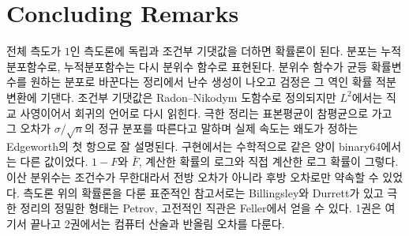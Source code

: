 \section{Concluding Remarks}

전체 측도가 $1$인 측도론에 독립과 조건부 기댓값을 더하면 확률론이 된다. 분포는 누적분포함수로, 누적분포함수는 다시 분위수 함수로 표현된다. 분위수 함수가 균등 확률변수를 원하는 분포로 바꾼다는 정리에서 난수 생성이 나오고 검정은 그 역인 확률 적분 변환에 기댄다. 조건부 기댓값은 Radon--Nikodym 도함수로 정의되지만 $L^2$에서는 직교 사영이어서 회귀의 언어로 다시 읽힌다. 극한 정리는 표본평균이 참평균으로 가고 그 오차가 $\sigma/\sqrt n$의 정규 분포를 따른다고 말하며 실제 속도는 왜도가 정하는 Edgeworth의 첫 항으로 잘 설명된다. 구현에서는 수학적으로 같은 양이 binary64에서는 다른 값이었다. $1-F$와 $\bar F$, 계산한 확률의 로그와 직접 계산한 로그 확률이 그렇다. 이산 분위수는 조건수가 무한대라서 전방 오차가 아니라 후방 오차로만 약속할 수 있었다. 측도론 위의 확률론을 다룬 표준적인 참고서로는 Billingsley\cite{billingsley1995}와 Durrett\cite{durrett2019}가 있고 극한 정리의 정밀한 형태는 Petrov\cite{petrov1975}, 고전적인 직관은 Feller\cite{feller1968}에서 얻을 수 있다. 1권은 여기서 끝나고 2권에서는 컴퓨터 산술과 반올림 오차를 다룬다.

\chapterreferences
